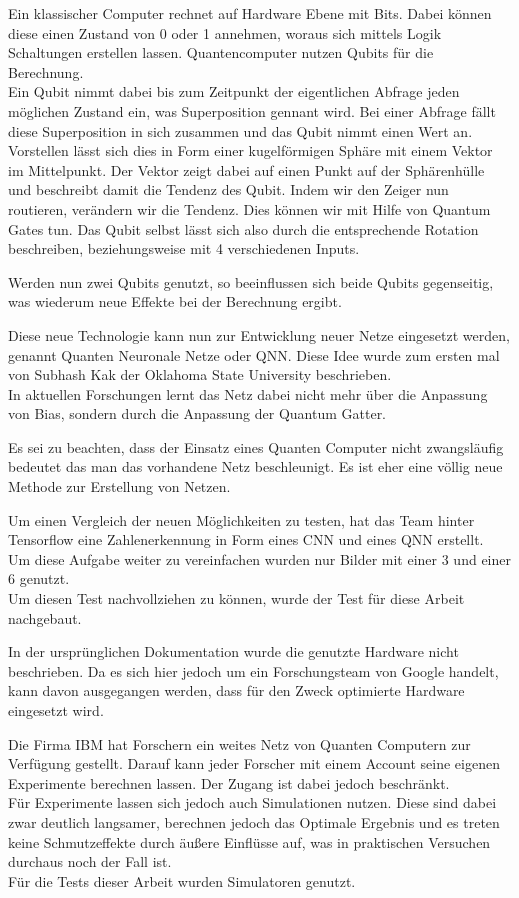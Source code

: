 \documentclass[
]{article}
\begin{document}
Ein klassischer Computer rechnet auf Hardware Ebene mit Bits. Dabei
können diese einen Zustand von 0 oder 1 annehmen, woraus sich mittels
Logik Schaltungen erstellen lassen. Quantencomputer nutzen Qubits für
die Berechnung. \\
Ein Qubit nimmt dabei bis zum Zeitpunkt der eigentlichen Abfrage jeden
möglichen Zustand ein, was Superposition gennant wird. Bei einer Abfrage
fällt diese Superposition in sich zusammen und das Qubit nimmt einen
Wert an. \\
Vorstellen lässt sich dies in Form einer kugelförmigen Sphäre mit einem
Vektor im Mittelpunkt. Der Vektor zeigt dabei auf einen Punkt auf der
Sphärenhülle und beschreibt damit die Tendenz des Qubit. Indem wir den
Zeiger nun routieren, verändern wir die Tendenz. Dies können wir mit
Hilfe von Quantum Gates tun. Das Qubit selbst lässt sich also durch die
entsprechende Rotation beschreiben, beziehungsweise mit 4 verschiedenen
Inputs.

Werden nun zwei Qubits genutzt, so beeinflussen sich beide Qubits
gegenseitig, was wiederum neue Effekte bei der Berechnung ergibt.

Diese neue Technologie kann nun zur Entwicklung neuer Netze eingesetzt
werden, genannt Quanten Neuronale Netze oder QNN. Diese Idee wurde zum
ersten mal von Subhash Kak der Oklahoma State University beschrieben. \\
In aktuellen Forschungen lernt das Netz dabei nicht mehr über die
Anpassung von Bias, sondern durch die Anpassung der Quantum Gatter.

Es sei zu beachten, dass der Einsatz eines Quanten Computer nicht
zwangsläufig bedeutet das man das vorhandene Netz beschleunigt. Es ist
eher eine völlig neue Methode zur Erstellung von Netzen.

Um einen Vergleich der neuen Möglichkeiten zu testen, hat das Team
hinter Tensorflow eine Zahlenerkennung in Form eines CNN und eines QNN
erstellt. \\
Um diese Aufgabe weiter zu vereinfachen wurden nur Bilder mit einer 3
und einer 6 genutzt. \\
Um diesen Test nachvollziehen zu können, wurde der Test für diese Arbeit
nachgebaut.

In der ursprünglichen Dokumentation wurde die genutzte Hardware nicht
beschrieben. Da es sich hier jedoch um ein Forschungsteam von Google
handelt, kann davon ausgegangen werden, dass für den Zweck optimierte
Hardware eingesetzt wird.

Die Firma IBM hat Forschern ein weites Netz von Quanten Computern zur
Verfügung gestellt. Darauf kann jeder Forscher mit einem Account seine
eigenen Experimente berechnen lassen. Der Zugang ist dabei jedoch
beschränkt. \\
Für Experimente lassen sich jedoch auch Simulationen nutzen. Diese sind
dabei zwar deutlich langsamer, berechnen jedoch das Optimale Ergebnis
und es treten keine Schmutzeffekte durch äußere Einflüsse auf, was in
praktischen Versuchen durchaus noch der Fall ist. \\
Für die Tests dieser Arbeit wurden Simulatoren genutzt.
\end{document}
